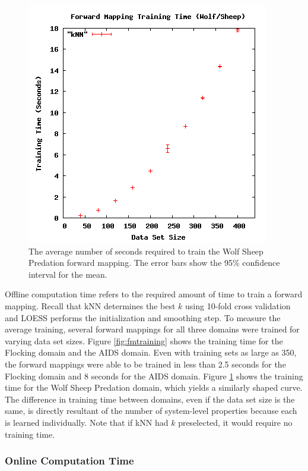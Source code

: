 \begin{figure}[ht]
\centering
\includegraphics[scale=.5]{images/results_wolfsheep/fm-training.png}
\caption{The average number of seconds required to train the Wolf Sheep Predation forward mapping.
The error bars show the 95\% confidence interval for the mean.}
\label{fig:wolfsheepfmtraining}
\end{figure}

Offline computation time refers to the required amount of time to train a forward mapping.
Recall that kNN determines the best $k$ using 10-fold cross validation and LOESS performs the initialization and smoothing step.
To measure the average training, several forward mappings for all three domains were trained for varying data set sizes.
Figure \ref{fig:fmtraining} shows the training time for the Flocking domain and the AIDS domain.
Even with training sets as large as 350, the forward mappings were able to be trained in less than 2.5 seconds for the Flocking domain and 8 seconds for the AIDS domain.
Figure \ref{fig:wolfsheepfmtraining} shows the training time for the Wolf Sheep Predation domain, which yields a similarly shaped curve.
The difference in training time between domains, even if the data set size is the same, is directly resultant of the number of system-level properties because each is learned individually.
Note that if kNN had $k$ preselected, it would require no training time.



  \subsubsection{Online Computation Time}

